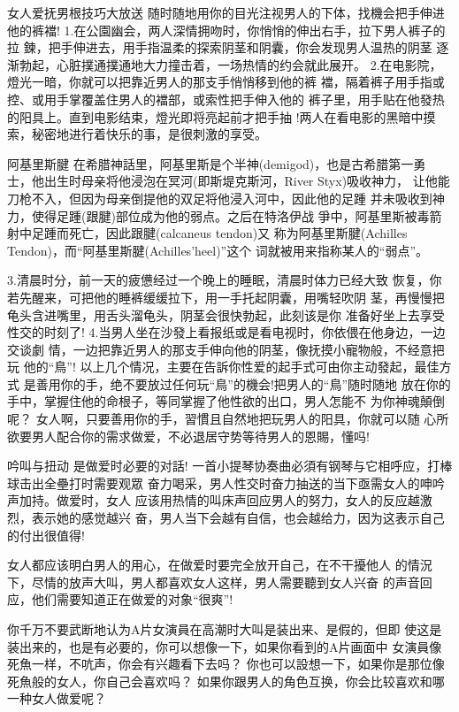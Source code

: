 \documentclass[12pt,UTF8]{ctexbook}
\begin{document}
女人爱抚男根技巧大放送
随时随地用你的目光注视男人的下体，找機会把手伸进他的裤襠!
1.在公園幽会，两人深情拥吻时，你悄悄的伸出右手，拉下男人裤子的拉
鍊，把手伸进去，用手指温柔的探索阴茎和阴囊，你会发现男人温热的阴茎
逐渐勃起，心脏撲通撲通地大力撞击着，一场热情的约会就此展开。
2.在电影院，燈光一暗，你就可以把靠近男人的那支手悄悄移到他的裤
襠，隔着裤子用手指或控、或用手掌覆盖住男人的襠部，或索性把手伸入他的
裤子里，用手贴在他發热的阳具上。直到电影结束，燈光即将亮起前才把手抽
!两人在看电影的黑暗中摸索，秘密地进行着快乐的事，是很刺激的享受。

阿基里斯腱
在希腊神話里，阿基里斯是个半神(demigod)，也是古希腊第一勇
士，他出生时母亲将他浸泡在冥河(即斯堤克斯河，River Styx)吸收神力，
让他能刀枪不入，但因为母亲倒提他的双足将他浸入河中，因此他的足踵
并未吸收到神力，使得足踵(跟腱)部位成为他的弱点。之后在特洛伊战
爭中，阿基里斯被毒箭射中足踵而死亡，因此跟腱(calcaneus tendon)又
称为阿基里斯腱(Achilles Tendon)，而“阿基里斯腱(Achilles'heel)”这个
词就被用来指称某人的“弱点”。

3.清晨时分，前一天的疲憊经过一个晚上的睡眠，清晨时体力已经大致
恢复，你若先醒来，可把他的睡裤缓缓拉下，用一手托起阴囊，用嘴轻吹阴
茎，再慢慢把龟头含进嘴里，用舌头溜龟头，阴茎会很快勃起，此刻该是你
准备好坐上去享受性交的时刻了!
4.当男人坐在沙發上看报纸或是看电视时，你依偎在他身边，一边交谈劇
情，一边把靠近男人的那支手伸向他的阴茎，像抚摸小寵物般，不经意把玩
他的“鳥”!
以上几个情况，主要在告訴你性爱的起手式可由你主动發起，最佳方式
是善用你的手，绝不要放过任何玩“鳥”的機会!把男人的“鳥”随时随地
放在你的手中，掌握住他的命根子，等同掌握了他性欲的出口，男人怎能不
为你神魂顛倒呢？
女人啊，只要善用你的手，習慣且自然地把玩男人的阳具，你就可以随
心所欲要男人配合你的需求做爱，不必退居守势等待男人的恩賜，懂吗!

吟叫与扭动
是做爱时必要的对話!
一首小提琴协奏曲必須有钢琴与它相呼应，打棒球击出全壘打时需要观眾
奋力喝采，男人性交时奋力抽送的当下亟需女人的呻吟声加持。做爱时，女人
应该用热情的叫床声回应男人的努力，女人的反应越激烈，表示她的感觉越兴
奋，男人当下会越有自信，也会越给力，因为这表示自己的付出很值得!

女人都应该明白男人的用心，在做爱时要完全放开自己，在不干擾他人
的情況下，尽情的放声大叫，男人都喜欢女人这样，男人需要聽到女人兴奋
的声音回应，他们需要知道正在做爱的对象“很爽”!

你千万不要武断地认为A片女演員在高潮时大叫是装出来、是假的，但即
使这是装出来的，也是有必要的，你可以想像一下，如果你看到的A片画面中
女演員像死魚一样，不吭声，你会有兴趣看下去吗？
你也可以設想一下，如果你是那位像死魚般的女人，你自己会喜欢吗？
如果你跟男人的角色互换，你会比较喜欢和哪一种女人做爱呢？
\end{document}
